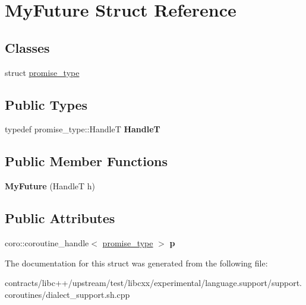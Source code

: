 \hypertarget{struct_my_future}{}\section{My\+Future Struct Reference}
\label{struct_my_future}
\subsection*{Classes}
\begin{DoxyCompactItemize}
\item 
struct \mbox{\hyperlink{struct_my_future_1_1promise__type}{promise\+\_\+type}}
\end{DoxyCompactItemize}
\subsection*{Public Types}
\begin{DoxyCompactItemize}
\item 
\mbox{\label{struct_my_future_a87408d7e9157d03d0180e377b6cc6a4c}} 
typedef promise\+\_\+type\+::\+HandleT {\bfseries HandleT}
\end{DoxyCompactItemize}
\subsection*{Public Member Functions}
\begin{DoxyCompactItemize}
\item 
\mbox{\label{struct_my_future_a2b6a88dae021d60df3719fd9e76099d5}} 
{\bfseries My\+Future} (HandleT h)
\end{DoxyCompactItemize}
\subsection*{Public Attributes}
\begin{DoxyCompactItemize}
\item 
\mbox{\label{struct_my_future_a60c7167a46aedff43dbfb78bf9dec110}} 
coro\+::coroutine\+\_\+handle$<$ \mbox{\hyperlink{struct_my_future_1_1promise__type}{promise\+\_\+type}} $>$ {\bfseries p}
\end{DoxyCompactItemize}


The documentation for this struct was generated from the following file\+:\begin{DoxyCompactItemize}
\item 
contracts/libc++/upstream/test/libcxx/experimental/language.\+support/support.\+coroutines/dialect\+\_\+support.\+sh.\+cpp\end{DoxyCompactItemize}
